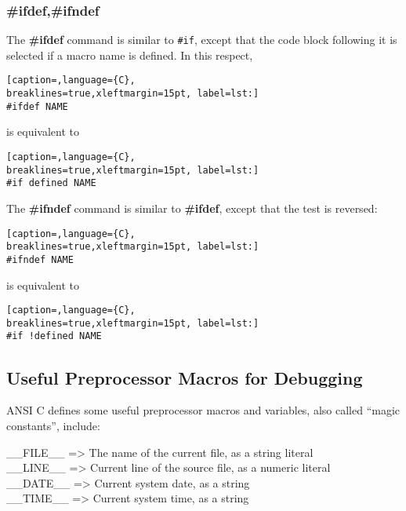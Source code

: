 \subsubsection{\#ifdef,\#ifndef}
The \textbf{\#ifdef} command is similar to \texttt{\#if}, except that the code
block following it is selected if a macro name is defined. In this respect,
\lstset{basicstyle=\scriptsize, numbers=left, captionpos=b, tabsize=4}
\begin{lstlisting}[caption=,language={C},
breaklines=true,xleftmargin=15pt, label=lst:]
#ifdef NAME
\end{lstlisting}

is equivalent to
\lstset{basicstyle=\scriptsize, numbers=left, captionpos=b, tabsize=4}
\begin{lstlisting}[caption=,language={C},
breaklines=true,xleftmargin=15pt, label=lst:]
#if defined NAME
\end{lstlisting}

The \textbf{\#ifndef} command is similar to \textbf{\#ifdef}, except that the
test is reversed:
\lstset{basicstyle=\scriptsize, numbers=left, captionpos=b, tabsize=4}
\begin{lstlisting}[caption=,language={C},
breaklines=true,xleftmargin=15pt, label=lst:]
#ifndef NAME
\end{lstlisting}

is equivalent to
\lstset{basicstyle=\scriptsize, numbers=left, captionpos=b, tabsize=4}
\begin{lstlisting}[caption=,language={C},
breaklines=true,xleftmargin=15pt, label=lst:]
#if !defined NAME
\end{lstlisting}

\subsection{Useful Preprocessor Macros for Debugging}
ANSI C defines some useful preprocessor macros and variables, also called ``magic constants'', include:

\_\_FILE\_\_ =\textgreater{} The name of the current file, as a string literal\\

\_\_LINE\_\_ =\textgreater{} Current line of the source file, as a numeric literal\\

\_\_DATE\_\_ =\textgreater{} Current system date, as a string\\

\_\_TIME\_\_ =\textgreater{} Current system time, as a string\\

